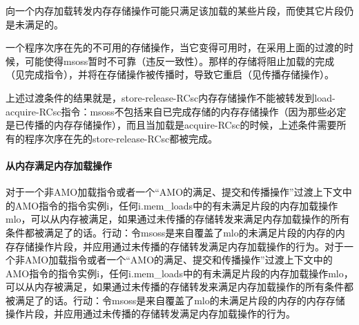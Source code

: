 \begin{commentary}
  向一个内存加载转发内存存储操作可能只满足该加载的某些片段，而使其它片段仍是未满足的。

一个程序次序在先的不可用的存储操作，当它变得可用时，在采用上面的过渡的时候，可能使得msoss暂时不可靠（违反一致性）。那样的存储将阻止加载的完成（见完成指令），并将在存储操作被传播时，导致它重启（见传播存储操作）。

上述过渡条件的结果就是，store-release-RCsc内存存储操作不能被转发到load-acquire-RCsc指令：msoss不包括来自已完成存储的内存存储操作（因为那些必定是已传播的内存存储操作），而且当加载是acquire-RCsc的时候，上述条件需要所有的程序次序在先的store-release-RCsc都被完成。
\end{commentary}


\paragraph{从内存满足内存加载操作}\label{omm:sat_from_mem}
对于一个非AMO加载指令或者一个“AMO的满足、提交和传播操作”过渡上下文中的AMO指令的指令实例i，任何i.mem_loads中的有未满足片段的内存加载操作mlo，可以从内存被满足，如果通过未传播的存储转发来满足内存加载操作的所有条件都被满足了的话。行动：令msoss是来自覆盖了mlo的未满足片段的内存的内存存储操作片段，并应用通过未传播的存储转发满足内存加载操作的行为。对于一个非AMO加载指令或者一个“AMO的满足、提交和传播操作”过渡上下文中的AMO指令的指令实例i，任何i.mem_loads中的有未满足片段的内存加载操作mlo，可以从内存被满足，如果通过未传播的存储转发来满足内存加载操作的所有条件都被满足了的话。行动：令msoss是来自覆盖了mlo的未满足片段的内存的内存存储操作片段，并应用通过未传播的存储转发满足内存加载操作的行为。

